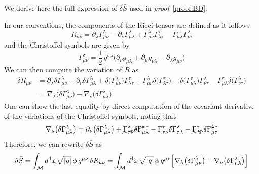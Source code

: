 We derive here the full expression of $\delta \bar{S}$ used in \textit{proof}~\ref{proof:BD}.

\noindent
In our conventions, the components of the Ricci tensor are defined as it follows
\begin{equation}
    R_{\mu\nu} = \partial_{\lambda}\Gamma^{\lambda}_{\mu\nu} 
           - \partial_{\nu}\Gamma^{\lambda}_{\mu\lambda} 
           + \Gamma^{\lambda}_{\mu\nu}\Gamma^{\tau}_{\lambda\tau} 
           - \Gamma^{\tau}_{\mu\lambda}\Gamma^{\lambda}_{\nu\tau}
\end{equation}
and the Christoﬀel symbols are given by
\begin{equation}
    \Gamma^{\sigma}_{\mu\nu} = \frac{1}{2}\,g^{\sigma\lambda}
    \bigl(\partial_{\nu}g_{\mu\lambda} + \partial_{\mu}g_{\nu\lambda} - \partial_{\lambda}g_{\mu\nu}\bigr)
\end{equation}
We can then compute the variation of $R$ as 
\begin{align}
    \delta R_{\mu\nu} &= \partial_{\lambda} \delta \Gamma^{\lambda}_{\mu\nu}
                  - \partial_{\nu} \delta\Gamma^{\lambda}_{\mu\lambda}
                  + \delta\bigl(\Gamma^{\lambda}_{\mu\nu}\bigr) \Gamma^{\tau}_{\lambda\tau}
                  + \Gamma^{\lambda}_{\mu\nu} \delta\bigl(\Gamma^{\tau}_{\lambda\tau}\bigr) 
                  - \delta\bigl(\Gamma^{\tau}_{\mu\lambda}\bigr)\Gamma^{\lambda}_{\nu\tau}  
                  - \Gamma^{\tau}_{\mu\lambda}\delta\bigl(\Gamma^{\lambda}_{\nu\tau}\bigr) \nonumber \\[6pt]
    &= \nabla_{\lambda}\bigl(\delta\Gamma^{\lambda}_{\mu\nu}\bigr) 
                  - \nabla_{\nu}\bigl(\delta\Gamma^{\lambda}_{\mu\lambda}\bigr)
\end{align}
One can show the last equality by direct computation of the covariant derivative of the variations of the Christoﬀel symbols, noting that
\begin{equation}
    \nabla_{\nu}\bigl(\delta\Gamma^{\lambda}_{\mu\lambda}\bigr) = \partial_{\nu}\bigl(\delta\Gamma^{\lambda}_{\mu\lambda}\bigr) + \cancel{\Gamma^{\lambda}_{\tau\nu}\delta\Gamma^{\tau}_{\mu\lambda}} - \Gamma^{\tau}_{\tau\nu}\delta\Gamma^{\lambda}_{\tau\lambda} - \cancel{\Gamma^{\tau}_{\lambda\nu}\delta\Gamma^{\lambda}_{\mu\tau}}
\end{equation}
Therefore, we can rewrite $\delta \bar{S}$ as
\begin{equation}\label{eq:deltaS1}
    \delta \bar{S} = \int_{\mathcal{M}} d^{4}x \,\sqrt{|g|}\,\phi\, g^{\mu\nu}\,\delta R_{\mu\nu} =
    \int_{\mathcal{M}} d^{4}x \,\sqrt{|g|}\,\phi\, g^{\mu\nu}
\Bigl[ \nabla_{\lambda}\bigl(\delta\Gamma^{\lambda}_{\mu\nu}\bigr)
      - \nabla_{\nu}\bigl(\delta\Gamma^{\lambda}_{\mu\lambda}\bigr)\Bigr]
\end{equation}
